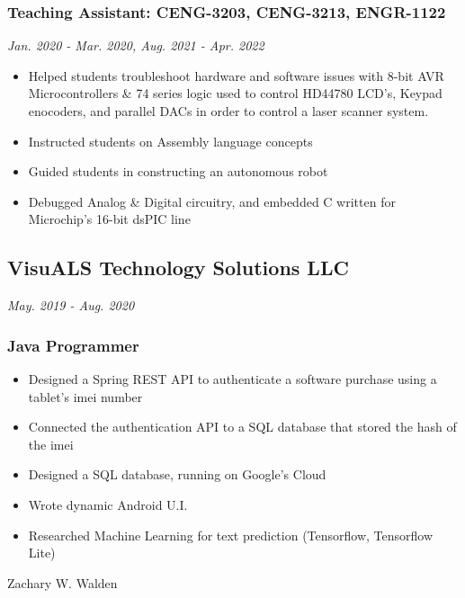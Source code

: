 \documentclass{article}
\begin{document}
\begin{spacing}{.5}
		\subsubsection{\large{Teaching Assistant: CENG-3203, CENG-3213, ENGR-1122}} \hfill \small{\textsl{Jan. 2020 - Mar. 2020, Aug. 2021 - Apr. 2022}}
			\begin{itemize}[label=--,itemsep=-.65ex]
				\item \large{Helped students troubleshoot hardware and software issues with 8-bit AVR Microcontrollers \& 74 series logic used to control HD44780 LCD's, Keypad enocoders, and parallel DACs in order to control a laser scanner system.}
				\item \large{Instructed students on Assembly language concepts}
				\item \large{Guided students in constructing an autonomous robot}
				\item \large{Debugged Analog \& Digital circuitry, and embedded C written for Microchip's 16-bit dsPIC line}
			\end{itemize}
	\subsection{VisuALS Technology Solutions LLC} \hfill \small{\textsl{May. 2019 - Aug. 2020}}
		\subsubsection{\large{Java Programmer}}
			\begin{itemize}[label=--,itemsep=-.65ex]
				\item \large{Designed a Spring REST API to authenticate a software purchase using a tablet's imei number}
				\item \large{Connected the authentication API to a SQL database that stored the hash of the imei}
				\item \large{Designed a SQL database, running on Google's Cloud}
				\item \large{Wrote dynamic Android U.I.}
				\item \large{Researched Machine Learning for text prediction} \small{(Tensorflow, Tensorflow Lite)}
			\end{itemize}

\newpage

\begin{center}
	\begin{huge}
		Zachary W. Walden\\
	\end{huge}
\end{center}


\end{spacing}
\end{document}
